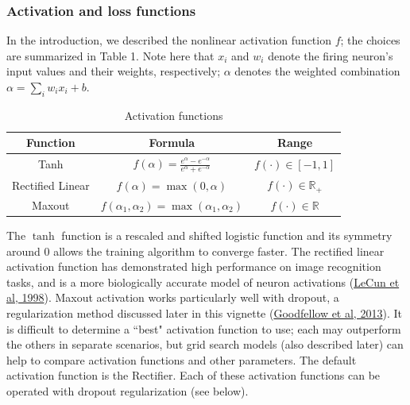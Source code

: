 \subsubsection{Activation and loss functions} \label{sssec:ActivationLoss}
In the introduction, we described the nonlinear activation function $f$; the choices are summarized in Table 1. Note here that $x_i$ and $w_i$ denote the firing neuron's input values and their weights, respectively; $\alpha$ denotes the weighted combination $\alpha = \sum_i w_i x_i+b$.
\begin{table}[ht] 
\caption{Activation functions }
\centering %
\begin{tabular}{c c c} %
\hline\hline %
Function & Formula & Range \\ [0.5ex] %
\hline %
Tanh & $f(\alpha) = \frac{e^{\alpha} - e ^{-\alpha}}{e^\alpha + e ^{-\alpha}}$ & $f(\cdot) \in [-1,1]$ \\ %
Rectified Linear & $f(\alpha) = \max(0,\alpha)$ & $f(\cdot) \in \mathbb{R}_+$ \\
Maxout & $f(\alpha_1,\alpha_2) = \max(\alpha_1,\alpha_2) $ & $f(\cdot) \in \mathbb{R}$\\  %
\hline %
\end{tabular} 
\label{table:nonlin} %
\end{table}
The $\tanh$ function is a rescaled and shifted logistic function and its symmetry around 0 allows the training algorithm to converge faster. The rectified linear activation function has demonstrated high performance on image recognition tasks, and is a more biologically accurate model of neuron activations (\href{http://yann.lecun.com/exdb/publis/pdf/lecun-98b.pdf}{LeCun et al, 1998}).  Maxout activation works particularly well with dropout, a regularization method discussed later in this vignette (\href{http://arxiv.org/pdf/1302.4389.pdf}{Goodfellow et al, 2013}). 
It is difficult to determine a ``best" activation function to use; each may outperform the others in separate scenarios, but grid search models (also described later) can help to compare activation functions and other parameters. The default activation function is the Rectifier. Each of these activation functions can be operated with dropout regularization (see below).

